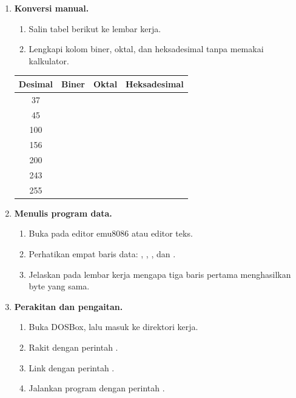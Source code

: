 \begin{enumerate}
    \item \textbf{Konversi manual.}
    \begin{enumerate}
        \item Salin tabel berikut ke lembar kerja.
        \item Lengkapi kolom biner, oktal, dan heksadesimal tanpa
              memakai kalkulator.
    \end{enumerate}

    \begin{center}
    \begin{tabular}{@{}cccc@{}}
        \toprule
        \textbf{Desimal} & \textbf{Biner} & \textbf{Oktal} &
        \textbf{Heksadesimal} \\
        \midrule
        37  & & & \\
        45  & & & \\
        100 & & & \\
        156 & & & \\
        200 & & & \\
        243 & & & \\
        255 & & & \\
        \bottomrule
    \end{tabular}
    \end{center}

    \item \textbf{Menulis program data.}
    \begin{enumerate}
        \item Buka  pada editor emu8086 atau editor
              teks.
        \item Perhatikan empat baris data: ,
              , , dan .
        \item Jelaskan pada lembar kerja mengapa tiga baris pertama
              menghasilkan byte yang sama.
    \end{enumerate}

    \item \textbf{Perakitan dan pengaitan.}
    \begin{enumerate}
        \item Buka DOSBox, lalu masuk ke direktori kerja.
        \item Rakit dengan perintah .
        \item Link dengan perintah .
        \item Jalankan program dengan perintah .
    \end{enumerate}


\end{enumerate}

